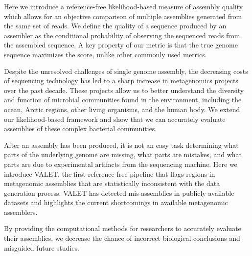 
Here we introduce a reference-free likelihood-based measure of assembly quality which allows for an objective comparison of multiple assemblies generated from the same set of reads. We define the quality of a sequence produced by an assembler as the conditional probability of observing the sequenced reads from the assembled sequence. A key property of our metric is that the true genome sequence maximizes the score, unlike other commonly used metrics.

Despite the unresolved challenges of single genome assembly, the decreasing costs of sequencing technology has led to a sharp increase in metagenomics projects over the past decade.
These projects allow us to better understand the diversity and function of microbial communities found in the environment, including the ocean, Arctic regions, other living organisms, and the human body.
We extend our likelihood-based framework and show that we can accurately evaluate assemblies of these complex bacterial communities.



After an assembly has been produced, it is not an easy task determining what parts of the underlying genome are missing, what parts are mistakes, and what parts are due to experimental artifacts from the sequencing machine.
Here we introduce VALET, the first reference-free pipeline that flags regions in metagenomic assemblies that are statistically inconsistent with the data generation process.
VALET has detected mis-assemblies in publicly available datasets and highlights the current shortcomings in available metagenomic assemblers.

By providing the computational methods for researchers to accurately evaluate their assemblies, we decrease the chance of incorrect biological conclusions and misguided future studies.


